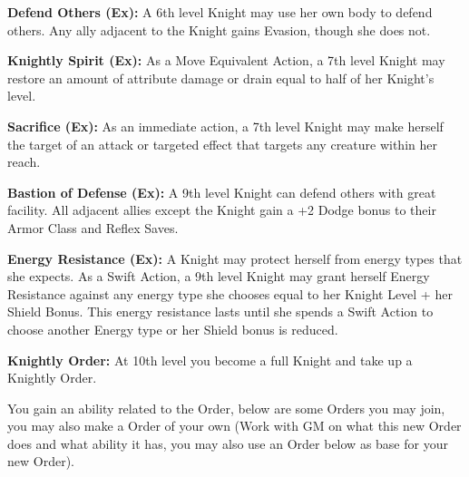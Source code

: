 \textbf{Defend Others (Ex):} A 6th level Knight may use her own body to defend others. Any ally adjacent to the Knight gains Evasion, though she does not.

\textbf{Knightly Spirit (Ex):} As a Move Equivalent Action, a 7th level Knight may restore an amount of attribute damage or drain equal to half of her Knight's level.

\textbf{Sacrifice (Ex):} As an immediate action, a 7th level Knight may make herself the target of an attack or targeted effect that targets any creature within her reach.

\textbf{Bastion of Defense (Ex):} A 9th level Knight can defend others with great facility. All adjacent allies except the Knight gain a +2 Dodge bonus to their Armor Class and Reflex Saves.

\textbf{Energy Resistance (Ex):} A Knight may protect herself from energy types that she expects. As a Swift Action, a 9th level Knight may grant herself Energy Resistance against any energy type she chooses equal to her Knight Level +  her Shield Bonus. This energy resistance lasts until she spends a Swift Action to choose another Energy type or her Shield bonus is reduced.

\textbf{Knightly Order:} At 10th level you become a full Knight and take up a Knightly Order. 

You gain an ability related to the Order, below are some Orders you may join, you may also make a Order of your own (Work with GM on what this new Order does and what ability it has, you may also use an Order below as base for your new Order).

